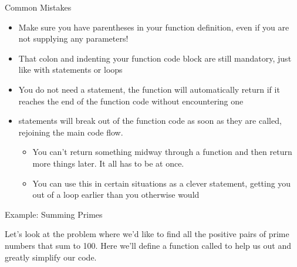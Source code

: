 \documentclass[pdf, aspectratio=169, 12pt]{beamer}
\begin{document}
\begin{frame}{Common Mistakes}
	\begin{itemize}[<+->]
		\item Make sure you have parentheses in your function definition, even if you are not supplying any parameters!
		\item That colon and indenting your function code block are still mandatory, just like with  statements or loops
		\item You do not need a  statement, the function will automatically return  if it reaches the end of the function code without encountering one
		\item {} statements will break out of the function code as soon as they are called, rejoining the main code flow.
			\begin{itemize}
				\item You can't return something midway through a function and then return more things later. It all has to be at once.
				\item You can use this in certain situations as a clever  statement, getting you out of a loop earlier than you otherwise would
			\end{itemize}
	\end{itemize}
\end{frame}

\begin{frame}{Example: Summing Primes}
	\begin{example}
		Let's look at the problem where we'd like to find all the positive pairs of prime numbers that sum to 100. Here we'll define a function called  to help us out and greatly simplify our code.
	\end{example}
\end{frame}

\end{document}
